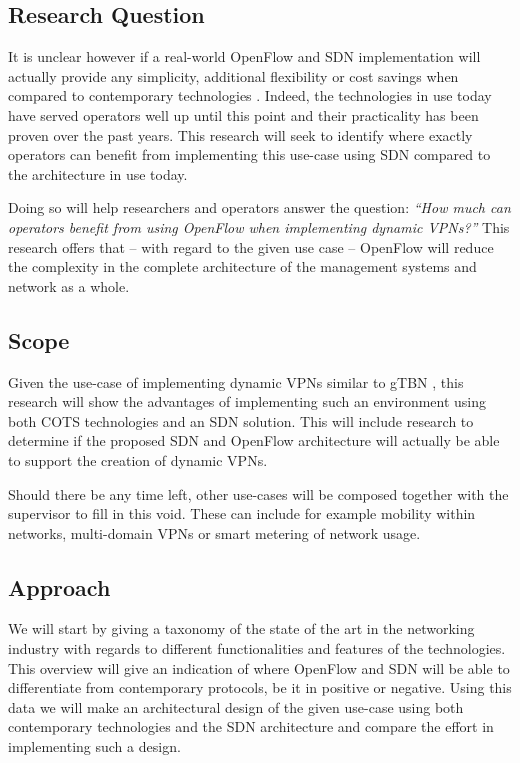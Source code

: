 \documentclass[oneside,twocolumn,8pt,a4paper]{article}
\begin{document}
		\subsection*{Research Question} %
		\label{sub:research_question}
		It is unclear however if a real-world OpenFlow and SDN implementation will actually provide any simplicity, additional flexibility or cost savings when compared to contemporary technologies \cite{programmability-answer}. Indeed, the technologies in use today have served operators well up until this point and their practicality has been proven over the past years. 
		This research will seek to identify where exactly operators can benefit from implementing this use-case using SDN compared to the architecture in use today. 
		
		Doing so will help researchers and operators answer the question: \textsl{``How much can operators benefit from using OpenFlow when implementing dynamic VPNs?''}
		This research offers that -- with regard to the given use case -- OpenFlow will reduce the complexity in the complete architecture of the management systems and network as a whole.

		
		\subsection*{Scope} %
		\label{sub:scope}
		Given the use-case of implementing dynamic VPNs similar to gTBN \cite{gtbn}, this research will show the advantages of implementing such an environment using both COTS technologies and an SDN solution. This will include research to determine if the proposed SDN and OpenFlow architecture will actually be able to support the creation of dynamic VPNs.
		
		Should there be any time left, other use-cases will be composed together with the supervisor to fill in this void. These can include for example mobility within networks, multi-domain VPNs or smart metering of network usage.
		
		\subsection*{Approach} %
		\label{sub:approach}
		We will start by giving a taxonomy of the state of the art in the networking industry with regards to different functionalities and features of the technologies. This overview will give an indication of where OpenFlow and SDN will be able to differentiate from contemporary protocols, be it in positive or negative. Using this data we will make an architectural design of the given use-case using both contemporary technologies and the SDN architecture and compare the effort in implementing such a design.
		
\end{document}
